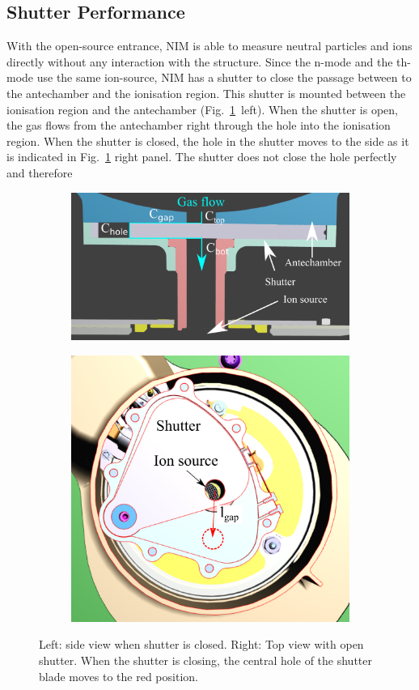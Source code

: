 	\subsection{Shutter Performance} \label{subsubsec:motorflow}
	With the open-source entrance, NIM is able to measure neutral particles and ions directly without any interaction with the structure. Since the n-mode and the th-mode use the same ion-source, NIM has a shutter to close the passage between to the antechamber and the ionisation region. This shutter is mounted between the ionisation region and the antechamber (Fig.~\ref{fig:shutterMotor}~left). When the shutter is open, the gas flows from the antechamber right through the hole into the ionisation region. When the shutter is closed, the hole in the shutter moves to the side as it is indicated in Fig.~\ref{fig:shutterMotor} right panel. The shutter does not close the hole perfectly and therefore 
	\begin{figure}[h!]
		\begin{subfigure}{0.5\textwidth}
			\centering
			\includegraphics[width=\textwidth]{Bilder/Shutter_sideview.png}
		\end{subfigure}
		\begin{subfigure}{0.5\textwidth}
			\centering
			\includegraphics[width=.8\textwidth]{Bilder/Shutter_topview.png}
		\end{subfigure}
		\caption{Left: side view when shutter is closed. Right: Top view with open shutter. When the shutter is closing, the central hole of the shutter blade moves to the red position.}
		\label{fig:shutterMotor}
	\end{figure}
